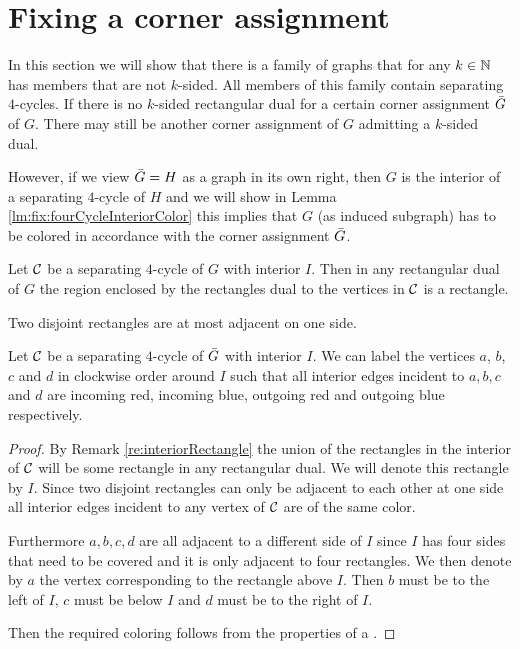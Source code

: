 
\section{Fixing a corner assignment}
  \label{s:fix}
  In this section we will show that there is a family of graphs that for any $k \in \mathbb{N}$ has members that are not $k$-sided. All members of this family contain separating $4$-cycles.
  If there is no $k$-sided rectangular dual for a certain corner assignment $\bar{G}$ of $G$. There may still be another corner assignment of $G$ admitting a $k$-sided dual.

  However, if we view $\bar{G} = H$ as a graph in its own right, then $G$ is the interior of a separating $4$-cycle of $H$ and we will show in Lemma \ref{lm:fix:fourCycleInteriorColor} this implies that $G$ (as induced subgraph) has to be colored in accordance with the corner assignment $\bar{G}$.

  \begin{remark}
  \label{re:interiorRectangle}
  Let $\mathcal{C}$ be a separating $4$-cycle of $G$ with interior $I$. Then in any rectangular dual of $G$ the region enclosed by the rectangles dual to the vertices in $\mathcal{C}$ is a rectangle.
  \end{remark}

  \begin{remark}
  \label{re:disjointRectanglesOnlyHaveOneAdjecentSide}
  Two disjoint rectangles are at most adjacent on one side.
  \end{remark}

  \begin{lemma}
  \label{lm:fix:fourCycleInteriorColor}
  Let $\mathcal{C}$ be a separating $4$-cycle of $\bar{G}$ with interior $I$. We can label the vertices $a$, $b$, $c$ and $d$ in clockwise order around $I$ such that all interior edges incident to $a, b, c$ and $d$ are incoming red, incoming blue, outgoing red and outgoing blue respectively.
  \end{lemma}

  \begin{proof}
  By Remark \ref{re:interiorRectangle} the union of the rectangles in the interior of $\mathcal{C}$ will be some rectangle in any rectangular dual. We will denote this rectangle by $I$. Since two disjoint rectangles can only be adjacent to each other at one side all interior edges incident to any vertex of $\mathcal{C}$ are of the same color.

  Furthermore $a, b, c, d$ are all adjacent to a different side of $I$ since $I$ has four sides that need to be covered and it is only adjacent to four rectangles. We then denote by $a$ the vertex corresponding to the rectangle above $I$. Then $b$ must be to the left of $I$, $c$ must be below $I$ and $d$ must be to the right of $I$.

  Then the required coloring follows from the properties of a \rel.

  \end{proof}

